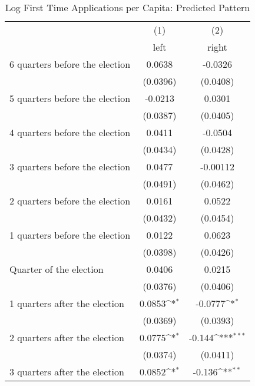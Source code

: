 \begin{table}[htbp]\centering
\def\sym#1{\ifmmode^{#1}\else\(^{#1}\)\fi}
\caption{Log First Time Applications per Capita: Predicted Pattern}
\begin{tabular}{l*{2}{c}}
\hline\hline
                    &\multicolumn{1}{c}{(1)}&\multicolumn{1}{c}{(2)}\\
                    &\multicolumn{1}{c}{left}&\multicolumn{1}{c}{right}\\
\hline
 6 quarters before the election&      0.0638         &     -0.0326         \\
                    &    (0.0396)         &    (0.0408)         \\
[1em]
 5 quarters before the election&     -0.0213         &      0.0301         \\
                    &    (0.0387)         &    (0.0405)         \\
[1em]
 4 quarters before the election&      0.0411         &     -0.0504         \\
                    &    (0.0434)         &    (0.0428)         \\
[1em]
 3 quarters before the election&      0.0477         &    -0.00112         \\
                    &    (0.0491)         &    (0.0462)         \\
[1em]
 2 quarters before the election&      0.0161         &      0.0522         \\
                    &    (0.0432)         &    (0.0454)         \\
[1em]
 1 quarters before the election&      0.0122         &      0.0623         \\
                    &    (0.0398)         &    (0.0426)         \\
[1em]
Quarter of the election&      0.0406         &      0.0215         \\
                    &    (0.0376)         &    (0.0406)         \\
[1em]
 1 quarters after the election&      0.0853\sym{*}  &     -0.0777\sym{*}  \\
                    &    (0.0369)         &    (0.0393)         \\
[1em]
 2 quarters after the election&      0.0775\sym{*}  &      -0.144\sym{***}\\
                    &    (0.0374)         &    (0.0411)         \\
[1em]
 3 quarters after the election&      0.0852\sym{*}  &      -0.136\sym{**} \\

\end{tabular}
\end{table}
